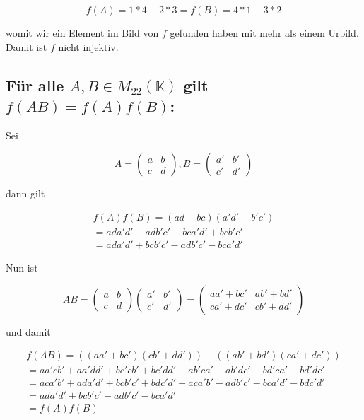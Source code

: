 \documentclass{article}
\begin{document}
\[f(A) = 1*4 - 2*3 = f(B) = 4*1 - 3*2\]

womit wir ein Element im Bild von \(f\) gefunden haben mit mehr als einem Urbild. Damit ist \(f\) nicht injektiv.

\subsection*{Für alle \(A, B\in M_{22}(\mathbb{K})\) gilt \(f(AB) = f(A) f(B)\):}

Sei

\[
A=
  \begin{pmatrix}
    a & b \\
    c & d
  \end{pmatrix}
,
B=
  \begin{pmatrix}
    a' & b' \\
    c' & d'
  \end{pmatrix}
\]

dann gilt

\[
\begin{split}
f(A)f(B)=(ad - bc)(a'd' - b'c')
\\
= ada'd' - adb'c' - bca'd' + bcb'c'
\\
= ada'd' + bcb'c' - adb'c' - bca'd'
\end{split}
\]

Nun ist

\[
AB=
  \begin{pmatrix}
    a & b \\
    c & d
  \end{pmatrix}
  \begin{pmatrix}
    a' & b' \\
    c' & d'
  \end{pmatrix}
  =
  \begin{pmatrix}
    aa'+bc' & ab'+bd' \\
    ca'+dc' & cb'+dd'
  \end{pmatrix}
\]

und damit

\[
\begin{split}
f(AB)= ((aa'+bc')(cb'+dd')) - ((ab'+bd')(ca'+dc'))
\\
     = aa'cb' + aa'dd' + bc'cb' + bc'dd' - ab'ca' - ab'dc' - bd'ca' - bd'dc'
\\
     = aca'b' + ada'd' + bcb'c' + bdc'd' -
       aca'b' - adb'c' - bca'd' - bdc'd'
\\
     = ada'd' + bcb'c' - adb'c' - bca'd'
\\
     = f(A)f(B)
\end{split}
\]
\end{document}

